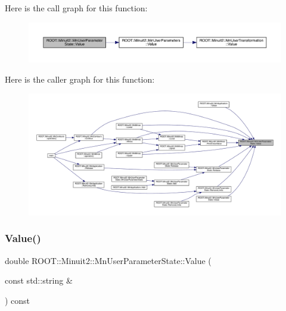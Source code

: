 Here is the call graph for this function\+:\nopagebreak
\begin{figure}[H]
\begin{center}
\leavevmode
\includegraphics[width=350pt]{d3/de0/classROOT_1_1Minuit2_1_1MnUserParameterState_a0f977953363899fd9ee8933b879cde3e_cgraph}
\end{center}
\end{figure}
Here is the caller graph for this function\+:\nopagebreak
\begin{figure}[H]
\begin{center}
\leavevmode
\includegraphics[width=350pt]{d3/de0/classROOT_1_1Minuit2_1_1MnUserParameterState_a0f977953363899fd9ee8933b879cde3e_icgraph}
\end{center}
\end{figure}
\mbox{\label{classROOT_1_1Minuit2_1_1MnUserParameterState_a02135107320f1ce5680fe25cf406f08f}} 
\subsubsection{\texorpdfstring{Value()}{Value()}\hspace{0.1cm}{\footnotesize\ttfamily [3/4]}}
{\footnotesize\ttfamily double R\+O\+O\+T\+::\+Minuit2\+::\+Mn\+User\+Parameter\+State\+::\+Value (\begin{DoxyParamCaption}\item[{const std\+::string \&}]{ }\end{DoxyParamCaption}) const}

